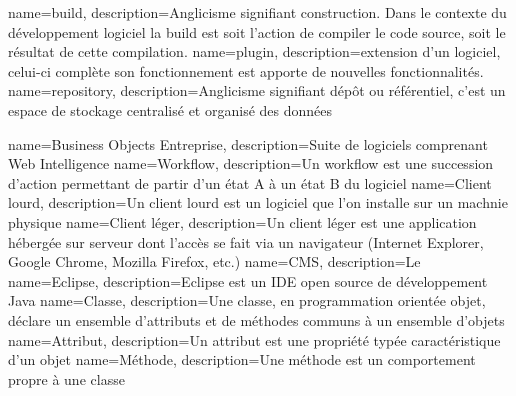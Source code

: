 

{
	name={build},
	description={Anglicisme signifiant construction. Dans le contexte du développement logiciel la build est soit l'action de compiler le code source, soit le résultat de cette compilation.}
}
{
	name={plugin},
	description={extension d'un logiciel, celui-ci complète son fonctionnement est apporte de nouvelles fonctionnalités.}
}
{
	name={repository},
	description={Anglicisme signifiant dépôt ou référentiel, c'est un espace de stockage centralisé et organisé des données}
}

{
	name={Business Objects Entreprise},
	description={Suite de logiciels comprenant Web Intelligence}
}
{
	name={Workflow},
	description={Un workflow est une succession d'action permettant de partir d'un état A à un état B du logiciel}
}
{
	name={Client lourd},
	description={Un client lourd est un logiciel que l'on installe sur un machnie physique}
}
{
	name={Client léger},
	description={Un client léger est une application hébergée sur serveur dont l'accès se fait via un navigateur (Internet Explorer, Google Chrome, Mozilla Firefox, etc.)}
}
{
	name={CMS},
	description={Le }
}
{
	name={Eclipse},
	description={Eclipse est un IDE open source de développement Java}
}
{
	name={Classe},
	description={Une classe, en programmation orientée objet, déclare un ensemble d'attributs et de méthodes communs à un ensemble d'objets}
}
{
	name={Attribut},
	description={Un attribut est une propriété typée caractéristique d'un objet}
}
{
	name={Méthode},
	description={Une méthode est un comportement propre à une classe}
}


